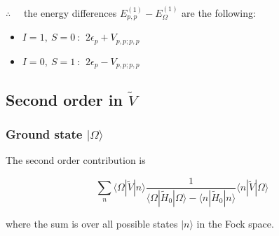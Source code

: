 \documentclass[
  letterpaper,
  DIV=11,
  numbers=noendperiod]{scrartcl}
\begin{document}
\begin{tcolorbox}[enhanced jigsaw, arc=.35mm, bottomrule=.15mm, bottomtitle=1mm, breakable, colback=white, colbacktitle=quarto-callout-note-color!10!white, colframe=quarto-callout-note-color-frame, coltitle=black, left=2mm, leftrule=.75mm, opacityback=0, opacitybacktitle=0.6, rightrule=.15mm, title=\textcolor{quarto-callout-note-color}{\faInfo}\hspace{0.5em}{Energy difference at \(\mathcal{O}(V)\) when \(p_1=p_2=p\)}, titlerule=0mm, toprule=.15mm, toptitle=1mm]

\(\therefore\quad\) the energy differences
\(E^{(1)}_{p,p}-E^{(1)}_\Omega\) are the following:

\begin{itemize}
\item
  \(I=1,\ S=0\ \): \(\ 2\epsilon_{p}+V_{p,p;p,p}\)
\item
  \(I=0,\ S=1\ \): \(\ 2\epsilon_{p}-V_{p,p;p,p}\)
\end{itemize}

\end{tcolorbox}

\subsection{\texorpdfstring{Second order in
\(\tilde V\)}{Second order in \textbackslash tilde V}}\label{second-order-in-tilde-v}

\subsubsection{\texorpdfstring{Ground state
\(|\Omega\rangle\)}{Ground state \textbar\textbackslash Omega\textbackslash rangle}}\label{sec-2ndOrderGroundState}

The second order contribution is

\begin{equation}
\sum_{n}\langle\Omega|\tilde V|n\rangle\frac{1}{\langle\Omega|\tilde H_0|\Omega\rangle-\langle n|\tilde H_0|n\rangle}\langle n|\tilde V|\Omega\rangle
\end{equation}

where the sum is over all possible states \(|n\rangle\) in the Fock
space.
\end{document}
